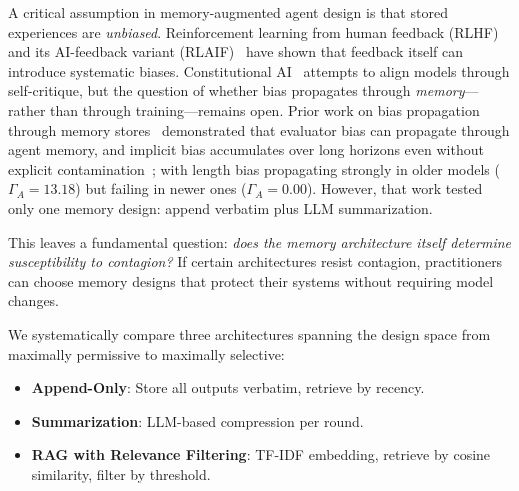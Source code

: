 \documentclass[11pt]{article}
\begin{document}
A critical assumption in memory-augmented agent design is that stored experiences are \emph{unbiased}. Reinforcement learning from human feedback (RLHF)~\cite{christiano2017deep,ouyang2022training} and its AI-feedback variant (RLAIF)~\cite{lee2023rlaif} have shown that feedback itself can introduce systematic biases. Constitutional AI~\cite{bai2022constitutional} attempts to align models through self-critique, but the question of whether bias propagates through \emph{memory}---rather than through training---remains open. Prior work on bias propagation through memory stores~\cite{bertalanic2026cost,huang2026cagecal,ma2026implicitbias} demonstrated that evaluator bias can propagate through agent memory, and implicit bias accumulates over long horizons even without explicit contamination~\cite{ma2026implicitbias}; with length bias propagating strongly in older models ($\Gamma_A = 13.18$) but failing in newer ones ($\Gamma_A = 0.00$). However, that work tested only one memory design: append verbatim plus LLM summarization.

This leaves a fundamental question: \emph{does the memory architecture itself determine susceptibility to contagion?} If certain architectures resist contagion, practitioners can choose memory designs that protect their systems without requiring model changes.

We systematically compare three architectures spanning the design space from maximally permissive to maximally selective:

\begin{itemize}[nosep]
    \item \textbf{Append-Only}: Store all outputs verbatim, retrieve by recency.
    \item \textbf{Summarization}: LLM-based compression per round.
    \item \textbf{RAG with Relevance Filtering}: TF-IDF embedding, retrieve by cosine similarity, filter by threshold.
\end{itemize}
\end{document}
